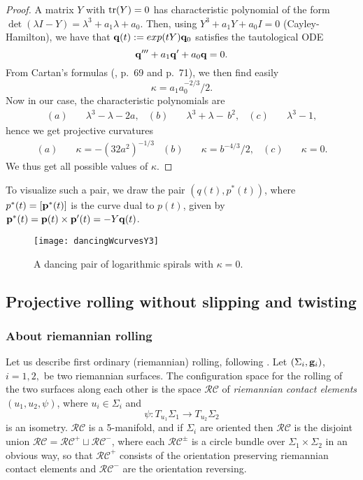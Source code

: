 \begin{proof} A matrix $Y$ with $\mbox{tr}(Y)=0$  has characteristic  polynomial  of the form $\det(\lambda I-Y)={\lambda}^{3}+a_1\lambda+a_0.$ 
Then, using $Y^3+a_1Y+a_0I=0$ (Cayley-Hamilton), we have that  $\mathbf q(t):=exp(tY)\mathbf q_0$ satisfies the tautological ODE
$$\mathbf q'''+a_1\mathbf q'+a_0\mathbf q=0.$$ 
From Cartan's formulas (\cite{Cbook}, p.~69 and  p.~71), we then find easily
$$\kappa=a_1a_0^{-2/3}/2.$$
Now in our case, the characteristic  polynomials are 
\begin{align*}
 (a)\quad&{\lambda}^{3}-\lambda-2a, &
 (b)\quad  & {\lambda}^{3}+\lambda-\,b^2, &
  (c)\quad & {\lambda}^{3}-1,
  \end{align*}   
hence we get projective curvatures 
\begin{align*}
 (a)\quad&  \kappa=-(32a^2)^{-1/3}&
 (b)\quad  &\kappa=b^{-4/3}/2,&
  (c)\quad & \kappa=0.
  \end{align*}   
We thus get all possible values of $\kappa$. \end{proof}
%
To visualize such a pair, we draw the pair $(q(t), p^*(t))$, where $p^*(t)=[{\mathbf p}^*(t)]$ is the curve dual  to $p(t)$, given by ${\mathbf p}^*(t)={\mathbf p}(t)\times{\mathbf p}'(t)=-Y\mathbf q(t)$.

\begin{figure}[h]\centering
\texttt{[image: dancingWcurvesY3]}
\caption{\small A dancing pair of logarithmic spirals with $\kappa=0$.}
\end{figure}




\subsection{Projective rolling without slipping and twisting}\label{RT}

\newcommand{\RC}{\mathcal{RC}}

\subsubsection{About riemannian rolling}
Let us describe  first   ordinary (riemannian) rolling, following \cite[p.~456]{BrHs}.   Let $(\Sigma_i, \mathbf{ g}_i)$, $i=1,2,$ be two   riemannian surfaces. 
The configuration space for  the rolling of the two  surfaces along each other  is the space $\RC$ of {\em riemannian contact elements} $(u_1, u_2, \psi)$, where $u_i\in\Sigma_i$ and $$\psi:T_{u_1}\Sigma_1\to T_{u_2}\Sigma_2$$ is an isometry.  
$\RC$ is a 5-manifold, and if $\Sigma_i$ are oriented then $\RC$ is the disjoint union $\RC=\RC^+\sqcup\RC^-$, where each $\RC^\pm$ is a circle bundle over $\Sigma_1\times\Sigma_2$ in an obvious way, so that  $\RC^+$ consists of the  orientation preserving riemannian contact elements and   $\RC^-$ are the orientation  reversing. 



